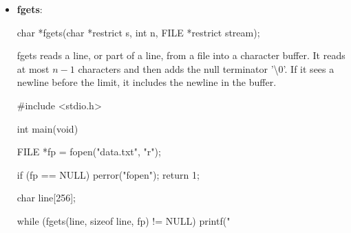 \documentclass{report}
\begin{document}
\begin{itemize}
\begin{cppcode}
                int main(void) {
                    FILE *fp = fopen("data.txt", "r");

                    if (fp == NULL) {
                        perror("fopen");
                        return 1;
                    }

                    int ch;

                    while ((ch = fgetc(fp)) != EOF) {
                        putchar(ch);
                    }

                    fclose(fp);
                    return 0;
                }
            \end{cppcode}
        \item \textbf{fgets}: 
            \begin{cppcode}
                char *fgets(char *restrict s, int n, FILE *restrict stream);
            \end{cppcode}
            \bigbreak \noindent 
            fgets reads a line, or part of a line, from a file into a character buffer.
            \bigbreak \noindent 
            It reads at most $n - 1$ characters and then adds the null terminator '\textbackslash 0'.
            \bigbreak \noindent 
            If it sees a newline before the limit, it includes the newline in the buffer.
            \bigbreak \noindent 
            \begin{cppcode}
                #include <stdio.h>

                int main(void) {
                    FILE *fp = fopen("data.txt", "r");

                    if (fp == NULL) {
                        perror("fopen");
                        return 1;
                    }

                    char line[256];

                    while (fgets(line, sizeof line, fp) != NULL) {
                        printf("%
                    }

}
\end{cppcode}
\end{itemize}
\end{document}
